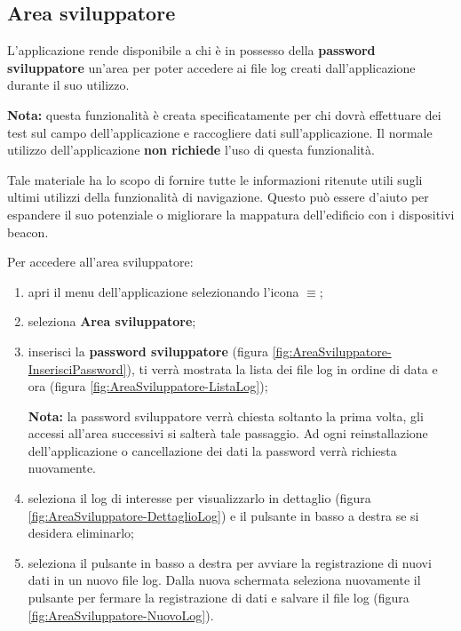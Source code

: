 \documentclass[../ClipsManualeUtente.tex]{subfiles}
\begin{document}
		
	\newpage
	\subsection{Area sviluppatore}
		L'applicazione rende disponibile a chi è in possesso della \textbf{password sviluppatore} un'area per poter accedere ai file log creati dall'applicazione durante il suo utilizzo.
		
		\begin{framed}
			\textbf{Nota:} questa funzionalità è creata specificatamente per chi dovrà effettuare dei test sul campo dell'applicazione e raccogliere dati sull'applicazione. Il normale utilizzo dell'applicazione \textbf{non richiede} l'uso di questa funzionalità.
		\end{framed}
		
		Tale materiale ha lo scopo di fornire tutte le informazioni ritenute utili sugli ultimi utilizzi della  funzionalità di navigazione. Questo può essere d'aiuto per espandere il suo potenziale o migliorare la mappatura dell'edificio con i dispositivi \gls{beacon}.
		
		Per accedere all'area sviluppatore:
		\begin{enumerate}
			\item apri il menu dell'applicazione selezionando l'icona $\equiv$;
			\item seleziona \textbf{Area sviluppatore}; %
			\item inserisci la \textbf{password sviluppatore} (figura \ref{fig:AreaSviluppatore-InserisciPassword}), ti verrà mostrata la lista dei file log in ordine di data e ora (figura \ref{fig:AreaSviluppatore-ListaLog});
			
		\begin{framed}
			\textbf{Nota:} la password sviluppatore verrà chiesta soltanto la prima volta, gli accessi all'area successivi si salterà tale passaggio. Ad ogni reinstallazione dell'applicazione o cancellazione dei dati la password verrà richiesta nuovamente.
		\end{framed}
					
			\item seleziona il log di interesse per visualizzarlo in dettaglio (figura \ref{fig:AreaSviluppatore-DettaglioLog}) e il pulsante in basso a destra se si desidera eliminarlo;
			
			\item seleziona il pulsante in basso a destra per avviare la registrazione di nuovi dati in un nuovo file log. Dalla nuova schermata seleziona nuovamente il pulsante per fermare la registrazione di dati e salvare il file log (figura \ref{fig:AreaSviluppatore-NuovoLog}).
		\end{enumerate}
		
\end{document}
